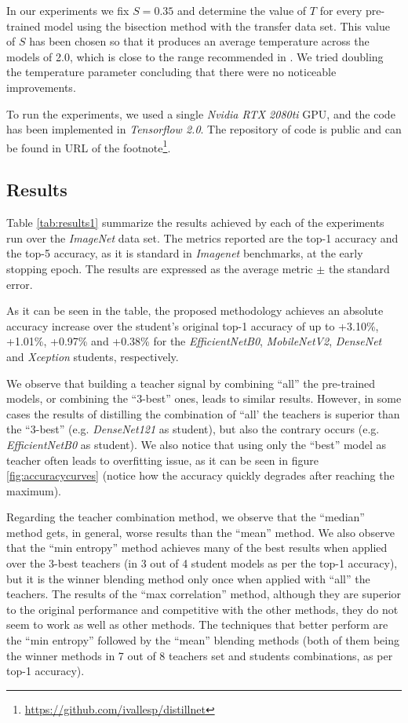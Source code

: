 \documentclass{elsarticle}
\begin{document}
	 In our experiments we fix $S=0.35$ and determine the value of $T$ for every pre-trained model using the bisection method with the transfer data set. This value of $S$ has been chosen so that it produces an average temperature across the models of 2.0, which is close to the range recommended in \citep{hinton2015}. We tried doubling the temperature parameter concluding that there were no noticeable improvements.

	 To run the experiments, we used a single \textit{Nvidia RTX 2080ti} GPU, and the code has been implemented in \textit{Tensorflow 2.0}. The repository of code is public and can be found in URL of the footnote\footnote{\url{https://github.com/ivallesp/distillnet}}.

	\subsection{Results}  \label{sec:results}
	Table \ref{tab:results1} summarize the results achieved by each of the experiments run over the \textit{ImageNet} data set. The metrics reported are the top-1 accuracy and the top-5 accuracy, as it is standard in \textit{Imagenet} benchmarks, at the early stopping epoch. The results are expressed as the average metric $\pm$ the standard error.

	As it can be seen in the table, the proposed methodology achieves an absolute accuracy increase over the student's original top-1 accuracy of up to +3.10\%, +1.01\%, +0.97\% and +0.38\% for the \textit{EfficientNetB0}, \textit{MobileNetV2},  \textit{DenseNet} and \textit{Xception} students, respectively.
	
	We observe that building a teacher signal by combining ``all'' the pre-trained models, or combining the ``3-best'' ones, leads to similar results. However, in some cases the results of distilling the combination of ``all' the teachers is superior than the ``3-best'' (e.g. \textit{DenseNet121} as student), but also the contrary occurs (e.g. \textit{EfficientNetB0} as student). We also notice that using only the ``best'' model as teacher often leads to overfitting issue, as it can be seen in figure \ref{fig:accuracycurves} (notice how the accuracy quickly degrades after reaching the maximum).

	Regarding the teacher combination method, we observe that the ``median'' method gets, in general, worse results than the ``mean'' method. We also observe that the ``min entropy'' method achieves many of the best results when applied over the 3-best teachers (in 3 out of 4 student models as per the top-1 accuracy), but it is the winner blending method only once when applied with ``all'' the teachers. The results of the ``max correlation'' method, although they are superior to the original performance and competitive with the other methods, they do not seem to work as well as other methods. The techniques that better perform are the ``min entropy'' followed by the ``mean'' blending methods (both of them being the winner methods in 7 out of 8 teachers set and students combinations, as per top-1 accuracy).
\end{document}
